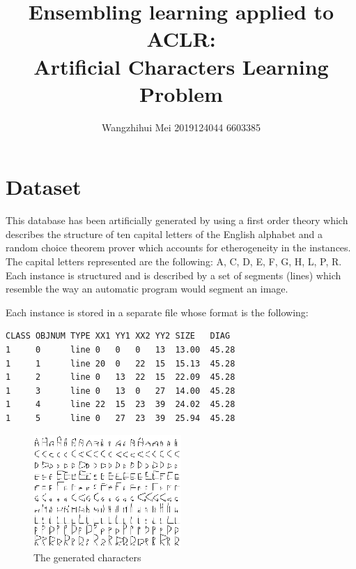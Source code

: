 \documentclass[11pt,en]{elegantpaper}
\title{Ensembling learning applied to ACLR:\\ Artificial Characters Learning Problem}
\author{Wangzhihui Mei 2019124044 6603385}
\institute{CCNU-UOW JI}
\date{}
\begin{document}
\maketitle



\section{Dataset}
This database has been artificially generated by using a first order theory which describes the structure of ten capital letters of the English alphabet and a random choice theorem prover which accounts for etherogeneity in the instances. The capital letters represented are the following: A, C, D, E, F, G, H, L, P, R. Each instance is structured and is described by a set of segments (lines) which resemble the way an automatic program would segment an image. 

Each instance is stored in a separate file whose format is the following:
\begin{lstlisting}
CLASS OBJNUM TYPE XX1 YY1 XX2 YY2 SIZE   DIAG
1     0      line 0   0   0   13  13.00  45.28
1     1      line 20  0   22  15  15.13  45.28
1     2      line 0   13  22  15  22.09  45.28
1     3      line 0   13  0   27  14.00  45.28
1     4      line 22  15  23  39  24.02  45.28
1     5      line 0   27  23  39  25.94  45.28
\end{lstlisting}

\begin{figure}[h]
	\centering
	\includegraphics[width=0.5\textwidth]{image/chars}
	\caption{The generated characters}
	\label{chars}
\end{figure}
\end{document}
